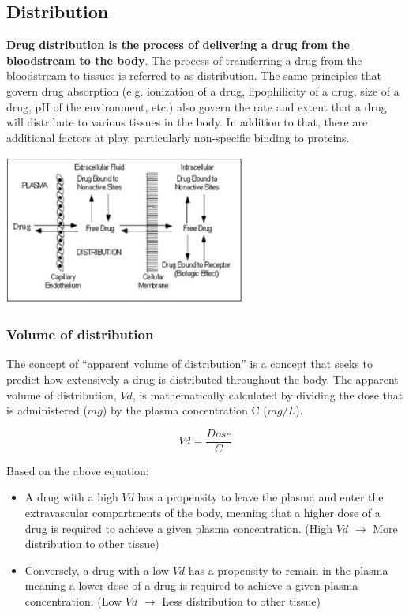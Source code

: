 \documentclass{book}
\begin{document}
\subsection{Distribution}
\textbf{Drug distribution is the process of delivering a drug from the bloodstream to
the body}.
The process of transferring a drug from the bloodstream to tissues is referred to as distribution. 
The same principles that govern drug absorption (e.g. ionization of a drug, lipophilicity of a drug, size of a drug, pH of the environment, etc.) also govern the rate and extent that a drug will distribute to various tissues in the body. 
In addition to that, there are additional factors at play, particularly non-specific binding to proteins.

\includegraphics[width=0.6\textwidth, center]{images/image4.png}

\subsubsection{Volume of distribution}
The concept of “apparent volume of distribution” is a concept that seeks to predict how
extensively a drug is distributed throughout the body. 
The apparent volume of distribution, $Vd$, is mathematically calculated by dividing the dose that is administered ($mg$) by the plasma concentration C ($mg/L$).

\begin{equation*}
    Vd = \frac{Dose}{C}
\end{equation*}

Based on the above equation:

\begin{itemize}
    \item A drug with a high $Vd$ has a propensity to leave the plasma and enter the extravascular compartments of the body, meaning that a higher dose of a drug is required to achieve a given plasma concentration. (High $Vd$ $\rightarrow$ More distribution to other tissue)
    \item Conversely, a drug with a low $Vd$ has a propensity to remain in the plasma meaning a lower dose of a drug is required to achieve a given plasma concentration. (Low $Vd$ $\rightarrow$ Less distribution to other tissue)

\end{itemize}
\end{document}
